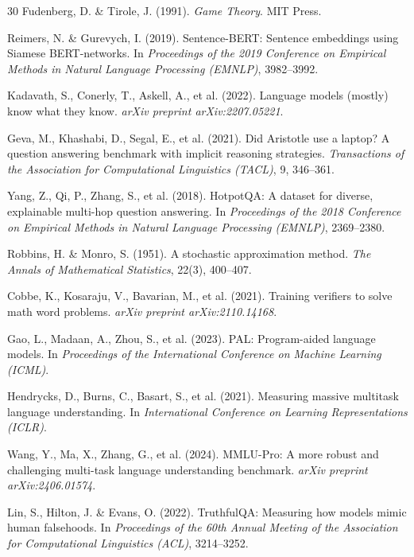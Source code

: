 \documentclass[12pt,a4paper]{article}
\begin{document}
\begin{thebibliography}{30}
Fudenberg, D. \& Tirole, J. (1991). \textit{Game Theory}. MIT Press.

Reimers, N. \& Gurevych, I. (2019). Sentence-BERT: Sentence embeddings using Siamese BERT-networks. In \textit{Proceedings of the 2019 Conference on Empirical Methods in Natural Language Processing (EMNLP)}, 3982--3992.

Kadavath, S., Conerly, T., Askell, A., et al. (2022). Language models (mostly) know what they know. \textit{arXiv preprint arXiv:2207.05221}.

Geva, M., Khashabi, D., Segal, E., et al. (2021). Did Aristotle use a laptop? A question answering benchmark with implicit reasoning strategies. \textit{Transactions of the Association for Computational Linguistics (TACL)}, 9, 346--361.

Yang, Z., Qi, P., Zhang, S., et al. (2018). HotpotQA: A dataset for diverse, explainable multi-hop question answering. In \textit{Proceedings of the 2018 Conference on Empirical Methods in Natural Language Processing (EMNLP)}, 2369--2380.

Robbins, H. \& Monro, S. (1951). A stochastic approximation method. \textit{The Annals of Mathematical Statistics}, 22(3), 400--407.

Cobbe, K., Kosaraju, V., Bavarian, M., et al. (2021). Training verifiers to solve math word problems. \textit{arXiv preprint arXiv:2110.14168}.

Gao, L., Madaan, A., Zhou, S., et al. (2023). PAL: Program-aided language models. In \textit{Proceedings of the International Conference on Machine Learning (ICML)}.

Hendrycks, D., Burns, C., Basart, S., et al. (2021). Measuring massive multitask language understanding. In \textit{International Conference on Learning Representations (ICLR)}.

Wang, Y., Ma, X., Zhang, G., et al. (2024). MMLU-Pro: A more robust and challenging multi-task language understanding benchmark. \textit{arXiv preprint arXiv:2406.01574}.

Lin, S., Hilton, J. \& Evans, O. (2022). TruthfulQA: Measuring how models mimic human falsehoods. In \textit{Proceedings of the 60th Annual Meeting of the Association for Computational Linguistics (ACL)}, 3214--3252.


\end{thebibliography}
\end{document}
